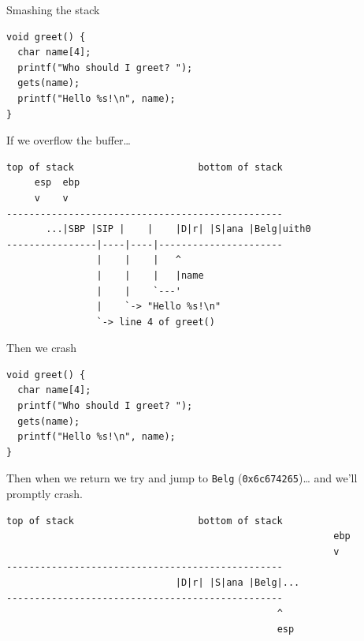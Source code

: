 \documentclass[9pt,aspectratio=169]{beamer}
\begin{document}
\begin{frame}[label={sec:org1053dbe},fragile]{Smashing the stack}
 \begin{verbatim}
void greet() {
  char name[4];
  printf("Who should I greet? ");
  gets(name);
  printf("Hello %s!\n", name);
}
\end{verbatim}

If we overflow the buffer\ldots{}

\begin{verbatim}
top of stack                      bottom of stack
     esp  ebp
     v    v
-------------------------------------------------
       ...|SBP |SIP |    |    |D|r| |S|ana |Belg|uith0
----------------|----|----|----------------------
                |    |    |   ^
                |    |    |   |name
                |    |    `---'
                |    `-> "Hello %s!\n"    
                `-> line 4 of greet()
\end{verbatim}
\end{frame}

\begin{frame}[label={sec:org7481670},fragile]{Then we crash}
 \begin{verbatim}
void greet() {
  char name[4];
  printf("Who should I greet? ");
  gets(name);
  printf("Hello %s!\n", name);
}
\end{verbatim}

Then when we return we try and jump to \texttt{Belg} (\texttt{0x6c674265})\ldots{} and we'll promptly crash.

\begin{verbatim}
top of stack                      bottom of stack
                                                          ebp
                                                          v
-------------------------------------------------
                              |D|r| |S|ana |Belg|...
-------------------------------------------------
                                                ^
                                                esp
\end{verbatim}
\end{frame}
\end{document}
